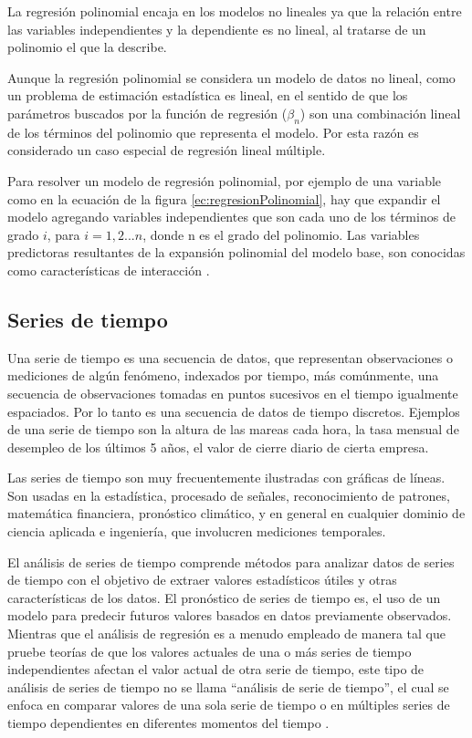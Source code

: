 La regresión polinomial encaja en los modelos no lineales ya que la relación entre las variables independientes y la dependiente es no lineal, al tratarse de un polinomio el que la describe.

Aunque la regresión polinomial se considera un modelo de datos no lineal, como un problema de estimación estadística es lineal, en el sentido de que los parámetros buscados por la función de regresión ($\beta_n$) son una combinación lineal de los términos del polinomio que representa el modelo. Por esta razón es considerado un caso especial de regresión lineal múltiple.

Para resolver un modelo de regresión polinomial, por ejemplo de una variable como en la ecuación de la figura \ref{ec:regresionPolinomial}, hay que expandir el modelo agregando variables independientes que son cada uno de los términos de grado $i$, para $i=1,2... n$, donde n es el grado del polinomio.
Las variables predictoras resultantes de la expansión polinomial del modelo base, son conocidas como características de interacción \cite{YWChangCJHsiehKWChangTrainingAndTesting}.

\subsection{Series de tiempo}
Una serie de tiempo es una secuencia de datos, que representan observaciones o mediciones de algún fenómeno, indexados por tiempo, más comúnmente, una secuencia de observaciones tomadas en puntos sucesivos en el tiempo igualmente espaciados. Por lo tanto es una secuencia de datos de tiempo discretos. 
Ejemplos de una serie de tiempo son la altura de las mareas cada hora, la tasa mensual de desempleo de los últimos 5 años, el valor de cierre diario de cierta empresa.

Las series de tiempo son muy frecuentemente ilustradas con gráficas de líneas. 
Son usadas en la estadística, procesado de señales, reconocimiento de patrones, matemática financiera, pronóstico climático, y en general en cualquier dominio de ciencia aplicada e ingeniería, que involucren mediciones temporales.

El análisis de series de tiempo comprende métodos para analizar datos de series de tiempo con el objetivo de extraer valores estadísticos útiles y otras características de los datos. 
El pronóstico de series de tiempo es, el uso de un modelo para predecir futuros valores basados en datos previamente observados. 
Mientras que el análisis de regresión es a menudo empleado de manera tal que pruebe teorías de que los valores actuales de una o más series de tiempo independientes afectan el valor actual de otra serie de tiempo, este tipo de análisis de series de tiempo no se llama
``análisis de serie de tiempo'', el cual se enfoca en comparar valores de una sola serie de tiempo o en múltiples series de tiempo dependientes en diferentes momentos del tiempo \cite{MImdadullahTimeSeriesAnalysis}.

